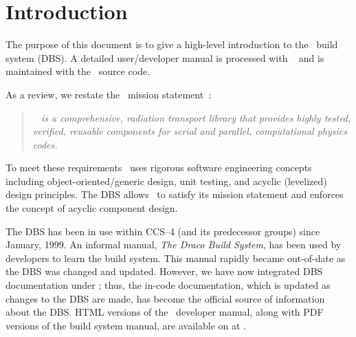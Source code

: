 
\section{Introduction}
\label{sec:intro}

The purpose of this document is to give a high-level introduction to
the \draco\ build system (DBS).  A detailed user/developer manual is
processed with ~\cite{doxygen} and is maintained with
the \draco\ source code.  

As a review, we restate the \draco\ mission statement~\cite{rn98046}:
\begin{quote}
  \slshape \draco\  is a comprehensive, radiation
  transport library that provides highly tested, verified, reusable
  components for serial and parallel, computational physics codes.
\end{quote}
To meet these requirements \draco\ uses rigorous software engineering
concepts including object-oriented/\-generic design, unit testing, and
acyclic (levelized) design principles. The DBS allows \draco\ to
satisfy its mission statement and enforces the concept of acyclic
component design.

The DBS has been in use within CCS--4 (and its predecessor groups)
since January, 1999.  An informal manual, \textit{The Draco Build
  System}, has been used by developers to learn the build system. This
manual rapidly became out-of-date as the DBS was changed and updated.
However, we have now integrated DBS documentation under
; thus, the in-code  documentation, which
is updated as changes to the DBS are made, has become the official
source of information about the DBS.  HTML versions of the \draco\ 
developer manual, along with PDF versions of the build system manual,
are available on \soft{SourceForge} \index{SourceForge} at
.

